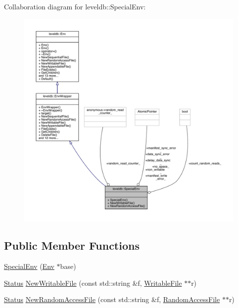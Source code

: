 Collaboration diagram for leveldb\+::Special\+Env\+:
\nopagebreak
\begin{figure}[H]
\begin{center}
\leavevmode
\includegraphics[width=350pt]{classleveldb_1_1_special_env__coll__graph}
\end{center}
\end{figure}
\subsection*{Public Member Functions}
\begin{DoxyCompactItemize}
\item 
\mbox{\hyperlink{classleveldb_1_1_special_env_a29fed9502e35a1f9374e0f46f4bd1181}{Special\+Env}} (\mbox{\hyperlink{classleveldb_1_1_env}{Env}} $\ast$base)
\item 
\mbox{\hyperlink{classleveldb_1_1_status}{Status}} \mbox{\hyperlink{classleveldb_1_1_special_env_a2a8b88051ccc5f957321d47af0dae5ed}{New\+Writable\+File}} (const std\+::string \&f, \mbox{\hyperlink{classleveldb_1_1_writable_file}{Writable\+File}} $\ast$$\ast$r)
\item 
\mbox{\hyperlink{classleveldb_1_1_status}{Status}} \mbox{\hyperlink{classleveldb_1_1_special_env_ae04ba2b7b94753d805e316dbda74ec00}{New\+Random\+Access\+File}} (const std\+::string \&f, \mbox{\hyperlink{classleveldb_1_1_random_access_file}{Random\+Access\+File}} $\ast$$\ast$r)
\end{DoxyCompactItemize}
